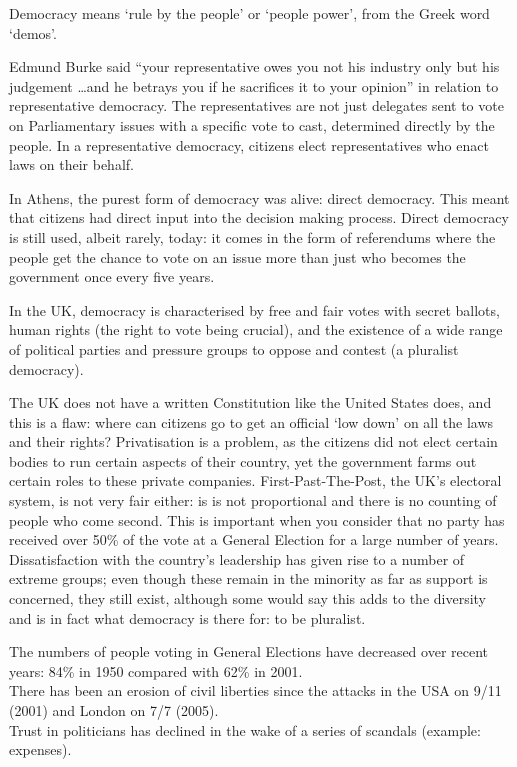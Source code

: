 \documentclass[12pt]{article}
\begin{document}
	Democracy means `rule by the people' or `people power', from the Greek word `demos'.
	
	Edmund Burke said ``your representative owes you not his industry only but his judgement \ldots and he betrays you if he sacrifices it to your opinion'' in relation to representative democracy.  The representatives are not just delegates sent to vote on Parliamentary issues with a specific vote to cast, determined directly by the people.  In a representative democracy, citizens elect representatives who enact laws on their behalf.
	
	In Athens, the purest form of democracy was alive: direct democracy.  This meant that citizens had direct input into the decision making process.  Direct democracy is still used, albeit rarely, today: it comes in the form of referendums where the people get the chance to vote on an issue more than just who becomes the government once every five years.
	
	In the UK, democracy is characterised by free and fair votes with secret ballots, human rights (the right to vote being crucial), and the existence of a wide range of political parties and pressure groups to oppose and contest (a pluralist democracy).
	
	The UK does not have a written Constitution like the United States does, and this is a flaw: where can citizens go to get an official `low down' on all the laws and their rights?  Privatisation is a problem, as the citizens did not elect certain bodies to run certain aspects of their country, yet the government farms out certain roles to these private companies.  First-Past-The-Post, the UK's electoral system, is not very fair either: is is not proportional and there is no counting of people who come second.  This is important when you consider that no party has received over 50\% of the vote at a General Election for a large number of years.  Dissatisfaction with the country's leadership has given rise to a number of extreme groups; even though these remain in the minority as far as support is concerned, they still exist, although some would say this adds to the diversity and is in fact what democracy is there for: to be pluralist.
	
	The numbers of people voting in General Elections have decreased over recent years: 84\% in 1950 compared with 62\% in 2001.\\
	There has been an erosion of civil liberties since the attacks in the USA on 9/11 (2001) and London on 7/7 (2005).\\
	Trust in politicians has declined in the wake of a series of scandals (example: expenses).
	
\end{document}
